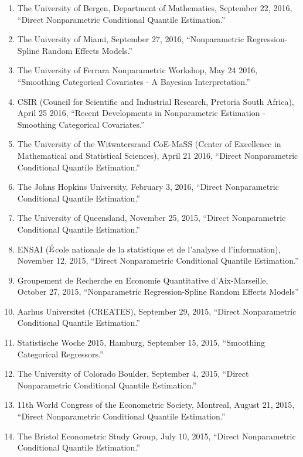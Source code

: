 \documentclass[
]{article}
\begin{document}
\begin{enumerate}
  Cornell University, October 4, 2016, ``Direct Nonparametric
  Conditional Quantile Estimation.''
\item
  The University of Bergen, Department of Mathematics, September 22,
  2016, ``Direct Nonparametric Conditional Quantile Estimation.''
\item
  The University of Miami, September 27, 2016, ``Nonparametric
  Regression-Spline Random Effects Models.''
\item
  The University of Ferrara Nonparametric Workshop, May 24 2016,
  ``Smoothing Categorical Covariates - A Bayesian Interpretation.''
\item
  CSIR (Council for Scientific and Industrial Research, Pretoria South
  Africa), April 25 2016, ``Recent Developments in Nonparametric
  Estimation - Smoothing Categorical Covariates.''
\item
  The University of the Witwatersrand CoE-MaSS (Center of Excellence in
  Mathematical and Statistical Sciences), April 21 2016, ``Direct
  Nonparametric Conditional Quantile Estimation.''
\item
  The Johns Hopkins University, February 3, 2016, ``Direct Nonparametric
  Conditional Quantile Estimation.''
\item
  The University of Queensland, November 25, 2015, ``Direct
  Nonparametric Conditional Quantile Estimation.''
\item
  ENSAI (\(\acute{\text E}\)cole nationale de la statistique et de
  l'analyse d l'information), November 12, 2015, ``Direct Nonparametric
  Conditional Quantile Estimation.''
\item
  Groupement de Recherche en Economie Quantitative d'Aix-Marseille,
  October 27, 2015, ``Nonparametric Regression-Spline Random Effects
  Models''
\item
  Aarhus Universitet (CREATES), September 29, 2015, ``Direct
  Nonparametric Conditional Quantile Estimation.''
\item
  Statistische Woche 2015, Hamburg, September 15, 2015, ``Smoothing
  Categorical Regressors.''
\item
  The University of Colorado Boulder, September 4, 2015, ``Direct
  Nonparametric Conditional Quantile Estimation.''
\item
  11th World Congress of the Econometric Society, Montreal, August 21,
  2015, ``Direct Nonparametric Conditional Quantile Estimation.''
\item
  The Bristol Econometric Study Group, July 10, 2015, ``Direct
  Nonparametric Conditional Quantile Estimation.''

\end{enumerate}
\end{document}
